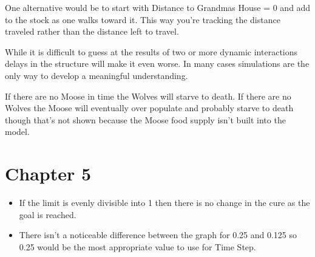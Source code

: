 \documentclass[]{memoir}
\begin{document}

One alternative would be to start with Distance to Grandmas House = 0
and add to the stock as one walks toward it. This way you're tracking
the distance traveled rather than the distance left to travel.


While it is difficult to guess at the results of two or more dynamic
interactions delays in the structure will make it even worse. In many
cases simulations are the only way to develop a meaningful
understanding.


If there are no Moose in time the Wolves will starve to death. If there
are no Wolves the Moose will eventually over populate and probably
starve to death though that's not shown because the Moose food supply
isn't built into the model.

\section{Chapter 5}


\begin{itemize}
\itemsep1pt\parskip0pt
\item
  If the limit is evenly divisible into 1 then there is no change in the
  cure as the goal is reached.
\item
  There isn't a noticeable difference between the graph for 0.25 and
  0.125 so 0.25 would be the most appropriate value to use for Time
  Step.
\end{itemize}
\end{document}
